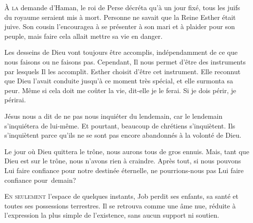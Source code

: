\lettrine{À}{ la} demande d'Haman, le roi de Perse décréta qu'à un jour fixé,
 tous les juifs du royaume seraient mis à mort.
 Personne ne savait que la Reine Esther était juive.
 Son cousin l'encouragea à se présenter à son mari et à plaider pour son peuple,
 mais faire cela allait mettre sa vie en danger.

Les desseins de Dieu vont toujours être accomplis,
 indépendamment de ce que nous faisons ou ne faisons pas.
 Cependant, Il nous permet d'être des instruments par lesquels Il les accomplit.
 Esther choisit d'être cet instrument.
 Elle reconnut que Dieu l'avait conduite jusqu'à ce moment très spécial,
 et elle surmonta sa peur.
 \Og Même si cela doit me coûter la vie, \Fg{} dit-elle \Og je le ferai.
 Si je dois périr, je périrai. \Fg{}

Jésus nous a dit de ne pas nous inquiéter du lendemain,
 car le lendemain s'inquiétera de lui-même.
 Et pourtant, beaucoup de chrétiens s'inquiètent.
 Ils s'inquiètent parce qu'ils ne se sont pas encore
 abandonnés à la volonté de Dieu.


Le jour où Dieu quittera le trône, nous aurons tous de gros ennuis.
 Mais, tant que Dieu est sur le trône, nous n'avons rien à craindre.
 Après tout, si nous pouvons Lui faire confiance pour notre destinée éternelle,
 ne pourrions-nous pas Lui faire confiance pour~demain?

\dvrule







\lettrine{E}{n seulement} l'espace de quelques instants,
 Job perdit ses enfants, sa santé et toutes ses possessions terrestres.
 Il se retrouva comme une âme nue, réduite à l'expression la plus simple
 de l'existence, sans aucun support ni soutien.

